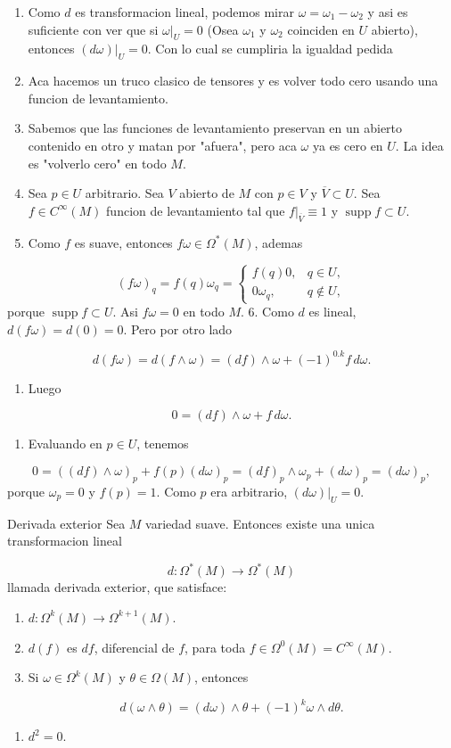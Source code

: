 \begin{bookproof}{}
\begin{enumerate}
\item Como $d$ es transformacion lineal, podemos mirar $\omega=\omega_1-\omega_2$ y asi es suficiente con ver que si $\omega|_U=0$ (Osea $\omega_{1}$ y $\omega_{2}$ coinciden en $U$ abierto), entonces $(d\omega)|_U=0$. Con lo cual se cumpliria la igualdad pedida
\item Aca hacemos un truco clasico de tensores y es volver todo cero usando una funcion de levantamiento.
\item Sabemos que las funciones de levantamiento preservan en un abierto contenido en otro y matan por "afuera", pero aca $\omega$ ya es cero en $U$. La idea es "volverlo cero" en todo $M$.
\item Sea $p\in U$ arbitrario. Sea $V$ abierto de $M$ con $p\in V$ y $\overline V\subset U$. Sea $f\in C^\infty(M)$ funcion de levantamiento tal que $f|_{\overline V}\equiv1$ y $\operatorname{supp}f\subset U$.
\item Como $f$ es suave, entonces $f\omega\in\Omega^*(M)$, ademas
\end{enumerate}
\[
(f\omega)_q=f(q)\omega_q=\begin{cases}f(q)0,&q\in U,\\0\omega_q,&q\notin U,\end{cases}
\]
porque $\operatorname{supp}f\subset U$. Asi $f\omega=0$ en todo $M$. 6. Como $d$ es lineal, $d(f\omega)=d(0)=0$. Pero por otro lado

\[
d(f\omega)=d(f\wedge\omega)=(df)\wedge\omega+(-1)^{0.k} f\,d\omega.
\]
\begin{enumerate}[start=7]
\item Luego
\end{enumerate}
\[
0=(df)\wedge\omega+f\,d\omega.
\]
\begin{enumerate}[start=8]
\item Evaluando en $p\in U$, tenemos
\end{enumerate}
\[
0=((df)\wedge\omega)_p+f(p)(d\omega)_p=(df)_p\wedge\omega_p+(d\omega)_p=(d\omega)_p,
\]
porque $\omega_p=0$ y $f(p)=1$. Como $p$ era arbitrario, $(d\omega)|_U=0$.

\bookqed
\end{bookproof}
\begin{booktheorem}{Derivada exterior}
Sea $M$ variedad suave. Entonces existe una unica transformacion lineal

\[
d:\Omega^*(M)\to\Omega^*(M)
\]
llamada derivada exterior, que satisface:

\begin{enumerate}
\item $d:\Omega^k(M)\to\Omega^{k+1}(M)$.
\item $d(f)$ es $df$, diferencial de $f$, para toda $f\in\Omega^0(M)=C^\infty(M)$.
\item Si $\omega\in\Omega^k(M)$ y $\theta\in\Omega(M)$, entonces
\end{enumerate}
\[
d(\omega\wedge\theta)=(d\omega)\wedge\theta+(-1)^k\omega\wedge d\theta.
\]
\begin{enumerate}[start=4]
\item $d^2=0$.
\end{enumerate}
\end{booktheorem}
